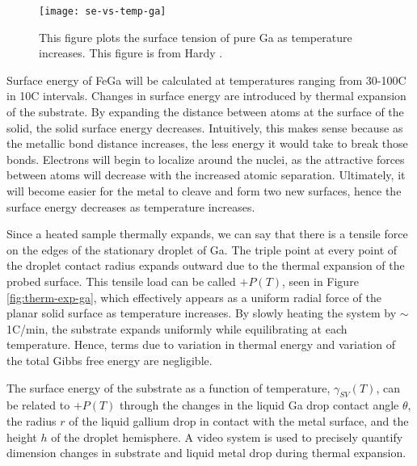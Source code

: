 

\begin{figure}
	\centering
	\texttt{[image: se-vs-temp-ga]}
	\caption{This figure plots the surface tension of pure Ga as temperature increases. This figure is from Hardy \etal \cite{Hardy1985}.}
	\label{fig:se-vs-temp-ga}
\end{figure}


Surface energy of FeGa will be calculated at temperatures ranging from 30-100\degree C in 10\degree C intervals. Changes in surface energy are introduced by thermal expansion of the substrate. By expanding the distance between atoms at the surface of the solid, the solid surface energy decreases. Intuitively, this makes sense because as the metallic bond distance increases, the less energy it would take to break those bonds. Electrons will begin to localize around the nuclei, as the attractive forces between atoms will decrease with the increased atomic separation. Ultimately, it will become easier for the metal to cleave and form two new surfaces, hence the surface energy decreases as temperature increases. 

Since a heated sample thermally expands, we can say that there is a tensile force on the edges of the stationary droplet of Ga. The triple point at every point of the droplet contact radius expands outward due to the thermal expansion of the probed surface. This tensile load can be called $ +P(T) $, seen in Figure \ref{fig:therm-exp-ga}, which effectively appears as a uniform radial force of the planar solid surface as temperature increases. By slowly heating the system by $\sim$1\degree C/min, the substrate expands uniformly while equilibrating at each temperature. Hence, terms due to variation in thermal energy and variation of the total Gibbs free energy are negligible. 

The surface energy of the substrate as a function of temperature, $\gamma_{SV}(T)$, can be related to $ +P(T) $ through the changes in the liquid Ga drop contact angle $\theta$, the radius $ r $ of the liquid gallium drop in contact with the metal surface, and the height $ h $ of the droplet hemisphere. A video system is used to precisely quantify dimension changes in substrate and liquid metal drop during thermal expansion.
%

